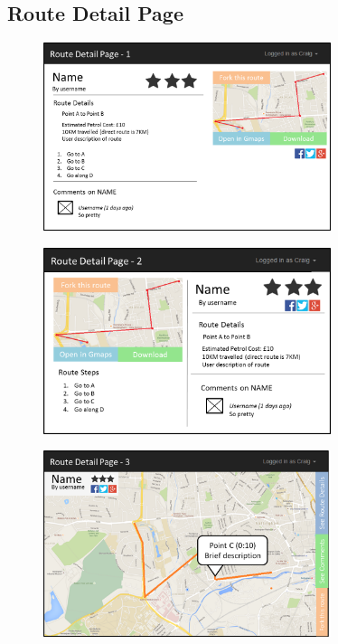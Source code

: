 \newpage 
\subsection{Route Detail Page}
\begin{figure}[!ht]
    \begin{center}
        \includegraphics[width=0.75\textwidth]{images/appendix/rdp1.png}
    \end{center}
    \vspace{-6mm}
\end{figure}

\begin{figure}[!ht]
    \begin{center}
        \includegraphics[width=0.75\textwidth]{images/appendix/rdp2.png}
    \end{center}
    \vspace{-6mm}
\end{figure}

\begin{figure}[!ht]
    \begin{center}
        \includegraphics[width=0.75\textwidth]{images/appendix/rdp3.png}
    \end{center}
    \vspace{-6mm}
\end{figure}

